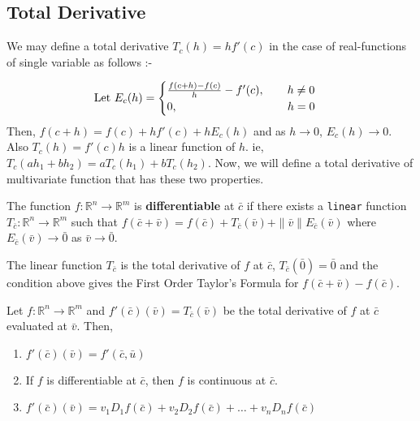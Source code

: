 \subsection{Total Derivative}
We may define a total derivative \( T_c(h) = hf'(c) \) in the case of real-functions of single variable as follows :-

\[ \text{Let }E_c(h) = \begin{cases} \frac{f(c+h)-f(c)}{h} - f'(c),\qquad h \ne 0 \\ 0,\hspace{3.4cm} h = 0 \end{cases} \]
Then, \( f(c+h) = f(c) + hf'(c) + hE_c(h) \) and as \( h \to 0 \), \( E_c(h) \to 0\).
Also \( T_c(h) = f'(c)h \) is a linear function of $h$.
ie, \( T_c(ah_1+bh_2) = aT_c(h_1)+bT_c(h_2) \).
Now, we will define a total derivative of multivariate function that has these two properties.

\begin{definition}
	The function \( f: \mathbb{R}^n \to \mathbb{R}^m \) is \textbf{differentiable} at $\bar{c}$
	if there exists a \texttt{linear} function \( T_{\bar{c}} : \mathbb{R}^n \to \mathbb{R}^m \)
	such that \( f(\bar{c}+\bar{v}) = f(\bar{c}) + T_{\bar{c}}(\bar{v}) + \|\bar{v}\| E_{\bar{c}}(\bar{v}) \)
	where \( E_{\bar{c}}(\bar{v}) \to \bar{0} \) as \(\bar{v} \to \bar{0}\).
\end{definition}

\begin{remark}
	The linear function $T_{\bar{c}}$ is the total derivative of $f$ at $\bar{c}$, \( T_{\bar{c}}(\bar{0}) = \bar{0} \) and the condition above gives the First Order Taylor's Formula for \( f(\bar{c}+\bar{v})-f(\bar{c}) \).
\end{remark}

\begin{remark}[Properties] Let \( f : \mathbb{R}^n \to \mathbb{R}^m \) and \( f'(\bar{c})(\bar{v}) = T_{\bar{c}}(\bar{v}) \) be the total derivative of $f$ at $\bar{c}$ evaluated at $\bar{v}$.
Then, 
\begin{enumerate}
	\item \( f'(\bar{c})(\bar{v}) = f'(\bar{c},\bar{u}) \)
	\item If $f$ is differentiable at $\bar{c}$, then $f$ is continuous at $\bar{c}$.
	\item \( f'(\bar{c})(\bar{v}) = v_1 D_1 f(\bar{c}) + v_2 D_2 f(\bar{c}) + \dots + v_n D_n f(\bar{c}) \)
	\end{enumerate}
\end{remark}

